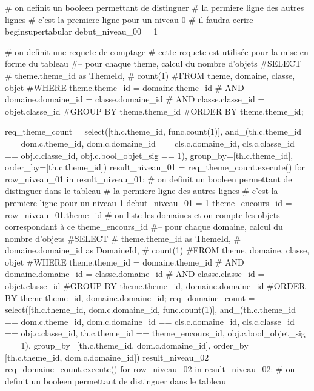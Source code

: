 \documentclass[12pt,titlepage]{book}
\begin{document}
\begin{lbdpython}

# on definit un booleen permettant de distinguer
# la permiere ligne des autres lignes
# c'est la premiere ligne pour un niveau 0
# il faudra ecrire begin{supertabular}
debut_niveau_00 = 1


# on definit une requete de comptage
# cette requete est utilisée pour la mise en forme du tableau
#-- pour chaque theme, calcul du nombre d'objets
#SELECT
#   theme.theme_id as ThemeId,
#   count(1)
#FROM theme, domaine, classe, objet
#WHERE theme.theme_id = domaine.theme_id 
#  AND domaine.domaine_id = classe.domaine_id
#  AND classe.classe_id = objet.classe_id
#GROUP BY theme.theme_id
#ORDER BY theme.theme_id;

req_theme_count = select([th.c.theme_id, func.count(1)],
                  and_(th.c.theme_id == dom.c.theme_id,
                       dom.c.domaine_id == cls.c.domaine_id,
                       cls.c.classe_id == obj.c.classe_id,
                       obj.c.bool_objet_sig == 1),
                  group_by=[th.c.theme_id],
                  order_by=[th.c.theme_id])
result_niveau_01 = req_theme_count.execute()
for row_niveau_01 in result_niveau_01:
   # on definit un booleen permettant de distinguer dans le tableau
   # la permiere ligne des autres lignes
   # c'est la premiere ligne pour un niveau 1
   debut_niveau_01 = 1
   theme_encours_id = row_niveau_01.theme_id
   # on liste les domaines et on compte les objets correspondant à ce theme_encours_id
   #-- pour chaque domaine, calcul du nombre d'objets
   #SELECT
   #   theme.theme_id as ThemeId,
   #   domaine.domaine_id as DomaineId,
   #   count(1)
   #FROM theme, domaine, classe, objet
   #WHERE theme.theme_id = domaine.theme_id
   #  AND domaine.domaine_id = classe.domaine_id
   #  AND classe.classe_id = objet.classe_id
   #GROUP BY theme.theme_id, domaine.domaine_id
   #ORDER BY theme.theme_id, domaine.domaine_id;
   req_domaine_count = select([th.c.theme_id, dom.c.domaine_id, func.count(1)],
                       and_(th.c.theme_id == dom.c.theme_id,
                            dom.c.domaine_id == cls.c.domaine_id,
                            cls.c.classe_id == obj.c.classe_id,
                            th.c.theme_id == theme_encours_id,
                            obj.c.bool_objet_sig == 1),
                       group_by=[th.c.theme_id, dom.c.domaine_id],
                       order_by=[th.c.theme_id, dom.c.domaine_id])
   result_niveau_02 = req_domaine_count.execute()
   for row_niveau_02 in result_niveau_02:
      # on definit un booleen permettant de distinguer dans le tableau

\end{lbdpython}
\end{document}
